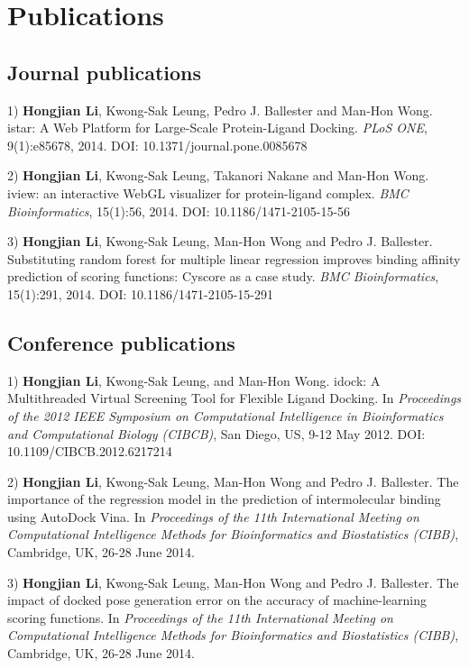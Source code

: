 \chapter{Publications}

\section{Journal publications}

1) \textbf{Hongjian Li}, Kwong-Sak Leung, Pedro J. Ballester and Man-Hon Wong. istar: A Web Platform for Large-Scale Protein-Ligand Docking. \textit{PLoS ONE}, 9(1):e85678, 2014. DOI: 10.1371/journal.pone.0085678

2) \textbf{Hongjian Li}, Kwong-Sak Leung, Takanori Nakane and Man-Hon Wong. iview: an interactive WebGL visualizer for protein-ligand complex. \textit{BMC Bioinformatics}, 15(1):56, 2014. DOI: 10.1186/1471-2105-15-56

3) \textbf{Hongjian Li}, Kwong-Sak Leung, Man-Hon Wong and Pedro J. Ballester. Substituting random forest for multiple linear regression improves binding affinity prediction of scoring functions: Cyscore as a case study. \textit{BMC Bioinformatics}, 15(1):291, 2014. DOI: 10.1186/1471-2105-15-291

\section{Conference publications}

1) \textbf{Hongjian Li}, Kwong-Sak Leung, and Man-Hon Wong. idock: A Multithreaded Virtual Screening Tool for Flexible Ligand Docking. In \textit{Proceedings of the 2012 IEEE Symposium on Computational Intelligence in Bioinformatics and Computational Biology (CIBCB)}, San Diego, US, 9-12 May 2012. DOI: 10.1109/CIBCB.2012.6217214

2) \textbf{Hongjian Li}, Kwong-Sak Leung, Man-Hon Wong and Pedro J. Ballester. The importance of the regression model in the prediction of intermolecular binding using AutoDock Vina. In \textit{Proceedings of the 11th International Meeting on Computational Intelligence Methods for Bioinformatics and Biostatistics (CIBB)}, Cambridge, UK, 26-28 June 2014.

3) \textbf{Hongjian Li}, Kwong-Sak Leung, Man-Hon Wong and Pedro J. Ballester. The impact of docked pose generation error on the accuracy of machine-learning scoring functions. In \textit{Proceedings of the 11th International Meeting on Computational Intelligence Methods for Bioinformatics and Biostatistics (CIBB)}, Cambridge, UK, 26-28 June 2014.

